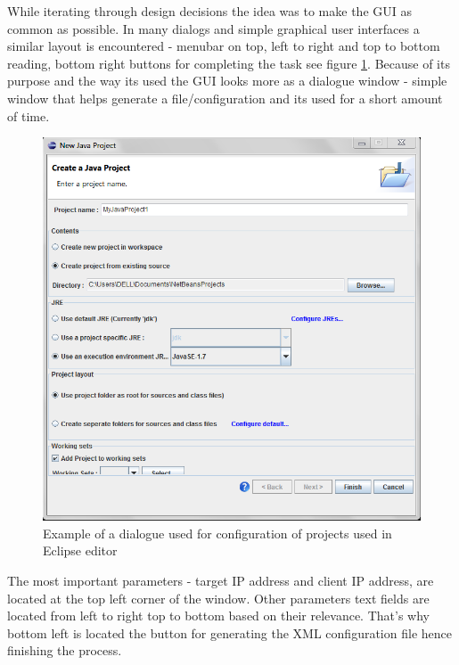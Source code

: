 While iterating through design decisions the idea was to make the GUI as common as possible. In many dialogs
and simple graphical user interfaces a similar layout is encountered - menubar on top, left to right and
top to bottom reading, bottom right buttons for completing the task see figure \ref{fig:guiex}. Because
of its purpose and the way its used the GUI looks more as a dialogue window - simple window that helps 
generate a file/configuration and its used for a short amount of time.

\begin{figure}[htp]
\centering
\includegraphics[scale=0.6]{Figures/gui_example1.png}
\caption{Example of a dialogue used for configuration of projects used in Eclipse editor}
\label{fig:guiex}
\end{figure}

The most important parameters - target IP address and client IP address,
are located at the top left corner of the window. Other parameters text fields are located from left  to right top to bottom
based on their relevance. That's why bottom left is located the button for generating the XML configuration
file hence finishing the process.

